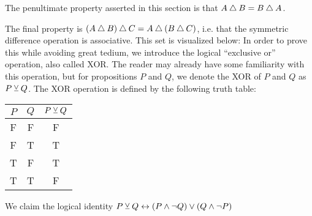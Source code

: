 {    The penultimate property asserted in this section is that $A \bigtriangleup B = B \bigtriangleup A$.

    The final property is $(A \bigtriangleup B) \bigtriangleup C = A \bigtriangleup (B \bigtriangleup C)$, i.e. that the symmetric difference operation is associative.
    This set is visualized below:
    In order to prove this while avoiding great tedium, we introduce the logical ``exclusive or'' operation, also called XOR.
    The reader may already have some familiarity with this operation, but for propositions $P$ and $Q$, we denote the XOR of $P$ and $Q$ as $P \veebar Q$.
    The XOR operation is defined by the following truth table:
    \begin{center}
        \begin{tabular}{cc|c}
            $P$ & $Q$ & $P \veebar Q$ \\
            \hline
            F   & F   & F           \\
            F   & T   & T           \\
            T   & F   & T           \\
            T   & T   & F
        \end{tabular}
    \end{center}
    \begin{lem}\label{lem:oper:xorid}
        We claim the logical identity $P \veebar Q \leftrightarrow (P \land \lnot Q) \lor (Q \land \lnot P)$
    \end{lem}
    }
